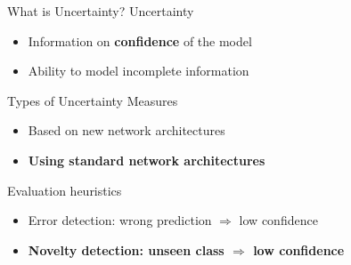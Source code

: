 \documentclass[xcolor={usenames,dvipsnames}]{beamer}
\begin{document}
\begin{frame}{What is Uncertainty?}
Uncertainty
	\begin{itemize}
		\item Information on \textbf{{\color{greenWUR} confidence}} of the model
		\item Ability to model incomplete information
	\end{itemize}
	\pause
	Types of Uncertainty Measures
	\begin{itemize}
		\item Based on new network architectures
		\item \textbf{\color{greenWUR} Using standard network architectures}
	\end{itemize}
	\pause
	Evaluation heuristics
	\begin{itemize}
		\item Error detection: wrong prediction $\Rightarrow$ low confidence
		\item {\color{greenWUR}\textbf{Novelty detection: unseen class $\Rightarrow$ low confidence}}
	\end{itemize}
\end{frame}
\end{document}

